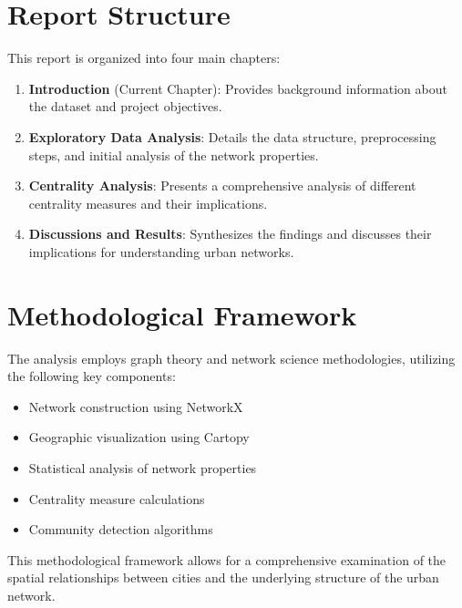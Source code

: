 \section{Report Structure}
This report is organized into four main chapters:

\begin{enumerate}
    \item \textbf{Introduction} (Current Chapter): Provides background information about the dataset and project objectives.
    
    \item \textbf{Exploratory Data Analysis}: Details the data structure, preprocessing steps, and initial analysis of the network properties.
    
    \item \textbf{Centrality Analysis}: Presents a comprehensive analysis of different centrality measures and their implications.
    
    \item \textbf{Discussions and Results}: Synthesizes the findings and discusses their implications for understanding urban networks.
\end{enumerate}

\section{Methodological Framework}
The analysis employs graph theory and network science methodologies, utilizing the following key components:
\begin{itemize}
    \item Network construction using NetworkX
    \item Geographic visualization using Cartopy
    \item Statistical analysis of network properties
    \item Centrality measure calculations
    \item Community detection algorithms
\end{itemize}

This methodological framework allows for a comprehensive examination of the spatial relationships between cities and the underlying structure of the urban network. 